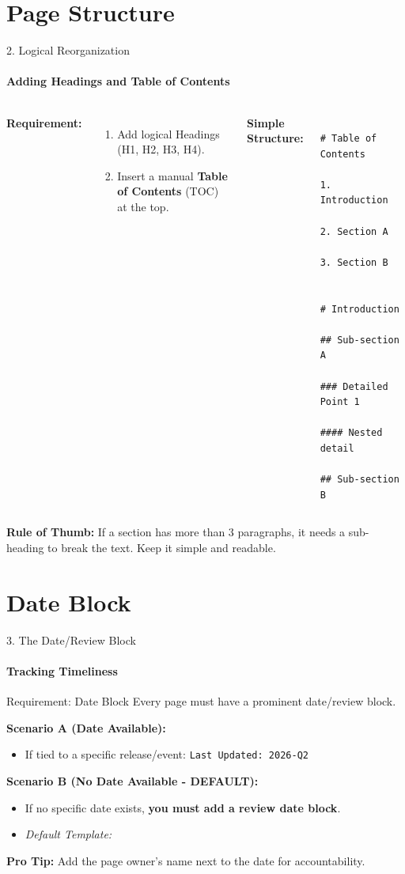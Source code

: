 \documentclass[10pt, aspectratio=169]{beamer}
\begin{document}
	\section{Page Structure}
	\begin{frame}[fragile]{2. Logical Reorganization}
		\framesubtitle{Adding Headings and Table of Contents}
		\begin{columns}[T]
			\textbf{Requirement:}
			\begin{enumerate}
				\item Add logical Headings (H1, H2, H3, H4).
				\item Insert a manual \textbf{Table of Contents} (TOC) at the top.
			\end{enumerate}
			\textbf{Simple Structure:}
			\begin{verbatim}
				# Table of Contents
				1. Introduction
				2. Section A
				3. Section B
				
				# Introduction
				## Sub-section A
				### Detailed Point 1
				#### Nested detail
				## Sub-section B
			\end{verbatim}
		\end{columns}
		\pause
		\vfill
		\textbf{Rule of Thumb:} If a section has more than 3 paragraphs, it needs a sub-heading to break the text. Keep it simple and readable.
	\end{frame}
	
	\section{Date Block}
	\begin{frame}{3. The Date/Review Block}
		\framesubtitle{Tracking Timeliness}
		\begin{block}{Requirement: Date Block}
			Every page must have a prominent date/review block.
		\end{block}
		\pause
		\textbf{Scenario A (Date Available):}
		\begin{itemize}
			\item If tied to a specific release/event: \texttt{Last Updated: 2026-Q2}
		\end{itemize}
		\pause
		\textbf{Scenario B (No Date Available - DEFAULT):}
		\begin{itemize}
			\item If no specific date exists, \textbf{you must add a review date block}.
			\item \textit{Default Template:} 
		\end{itemize}
		\pause
		\begin{center}
		\end{center}
		\vspace{0.3cm}
		\pause
		\textbf{Pro Tip:} Add the page owner's name next to the date for accountability.
	\end{frame}
	
\end{document}
